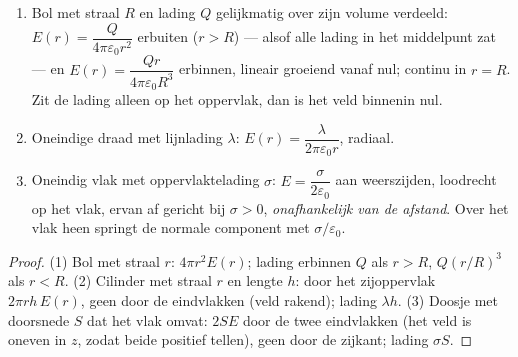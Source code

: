 \begin{proposition}\label{prop:b1:electrostatics-gauss:three}
\begin{enumerate}
  \item Bol met straal $R$ en lading $Q$ gelijkmatig over zijn
        volume verdeeld: $E(r) = \dfrac{Q}{4\pi\varepsilon_0r^2}$ erbuiten ($r > R$) ---
        alsof alle lading in het middelpunt zat --- en $E(r) =
        \dfrac{Qr}{4\pi\varepsilon_0R^3}$ erbinnen, lineair groeiend vanaf nul;
        continu in $r = R$. Zit de lading alleen op het oppervlak,
        dan is het veld binnenin nul.
  \item Oneindige draad met lijnlading $\lambda$: $E(r) =
        \dfrac{\lambda}{2\pi\varepsilon_0 r}$, radiaal.
  \item Oneindig vlak met oppervlaktelading $\sigma$: $E = \dfrac{\sigma}{2\varepsilon_0}$
        aan weerszijden, loodrecht op het vlak, ervan af gericht bij
        $\sigma > 0$, \emph{onafhankelijk van de afstand}. Over het vlak heen
        springt de normale component met $\sigma/\varepsilon_0$.
\end{enumerate}
\end{proposition}

\begin{proof}
(1) Bol met straal $r$:  $4\pi r^2E(r)$; lading erbinnen $Q$ als
$r > R$, $Q(r/R)^3$ als $r < R$. (2) Cilinder met straal $r$ en lengte $h$:
 door het zijoppervlak $2\pi rh\,E(r)$, geen door de eindvlakken
(veld rakend); lading $\lambda h$. (3) Doosje met doorsnede $S$
dat het vlak omvat:  $2SE$ door de twee eindvlakken (het veld is oneven
in $z$, zodat beide positief tellen), geen door de zijkant; lading
$\sigma S$.
\end{proof}

